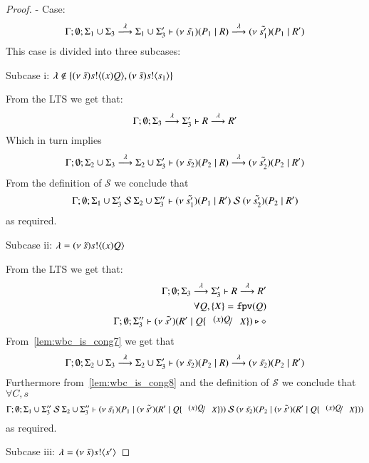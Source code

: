 \begin{proof}

	\noi - Case:
%
	\[
		\Gamma; \emptyset; \Sigma_1 \cup \Sigma_3 \stackrel{\lambda}{\longrightarrow} \Sigma_1 \cup \Sigma_3' \vdash (\nu\ \tilde{s_1})(P_1 \;|\; R) \stackrel{\lambda}{\longrightarrow} (\nu\ \tilde{s_1'})(P_1 \;|\; R')
	\]
%
	\noi This case is divided into three subcases:

	\noi Subcase i: $\lambda \notin \{(\nu\ \tilde{s}) s ! \langle (x)Q \rangle, (\nu\ \tilde{s}) s ! \langle s_1 \rangle\}$

	\noi From the LTS we get that:
	\[
		\Gamma; \emptyset; \Sigma_3 \by{\lambda} \Sigma_3' \proves R \by{\lambda} R' %
	\]
%
	\noi Which in turn implies
	\begin{eqnarray*}
		\Gamma; \emptyset; \Sigma_2 \cup \Sigma_3 \stackrel{\lambda}{\longrightarrow} \Sigma_2 \cup \Sigma_3' \vdash (\nu\ \tilde{s_2})(P_2 \;|\; R) \stackrel{\lambda}{\longrightarrow} (\nu\ \tilde{s_2'})(P_2 \;|\; R')
	\end{eqnarray*}
%
	\noi From the definition of $\mathcal{S}$ we conclude that
	\[
		\Gamma; \emptyset; \Sigma_1 \cup \Sigma_3'\ \mathcal{S}\ \Sigma_2 \cup \Sigma_3'' \vdash (\nu\ \tilde{s_1'})(P_1 \;|\; R')\ \mathcal{S}\ (\nu\ \tilde{s_2'})(P_2 \;|\; R')
	\]
	\noi as required.

	\noi Subcase ii: $\lambda = (\nu\ \tilde{s}) s ! \langle (x)Q \rangle$

	\noi From the LTS we get that:
	\begin{eqnarray}
		& &	\Gamma; \emptyset; \Sigma_3 \by{\lambda} \Sigma_3' \proves R \by{\lambda} R' \label{lem:wbc_is_cong7}\\
		& & 	\forall Q, \set{X} = \fpv{Q}\\
		& &	\Gamma; \emptyset; \Sigma_3'' \proves \newsp{\tilde{s'}}{R' \Par Q \subst{(x) Q}{X}} \hastype \Proc \label{lem:wbc_is_cong8}
	\end{eqnarray}
%
	\noi From~\ref{lem:wbc_is_cong7} we get that
	\[
		\Gamma; \emptyset; \Sigma_2 \cup \Sigma_3 \stackrel{\lambda}{\longrightarrow} \Sigma_2 \cup \Sigma_3' \vdash (\nu\ \tilde{s_2})(P_2 \;|\; R) \stackrel{\lambda}{\longrightarrow} (\nu\ \tilde{s_2})(P_2 \;|\; R')
	\]
	\noi Furthermore from~\ref{lem:wbc_is_cong8} and the definition of $\mathcal{S}$ we conclude that
	$\forall C,s$
	\[
		\Gamma; \emptyset; \Sigma_1 \cup \Sigma_3''\ \mathcal{S}\ \Sigma_2 \cup \Sigma_3'' \proves \newsp{\tilde{s_1}}{P_1 \Par \newsp{\tilde{s'}}{R' \Par Q \subst{(x) Q}{X}}}\ \mathcal{S}\ \newsp{\tilde{s_2}}{P_2 \Par \newsp{\tilde{s'}}{R' \Par Q \subst{(x) Q}{X}}}
	\]
	\noi as required.

	\noi Subcase iii: $\lambda = (\nu\ \tilde{s}) s ! \langle s' \rangle$


\end{proof}
